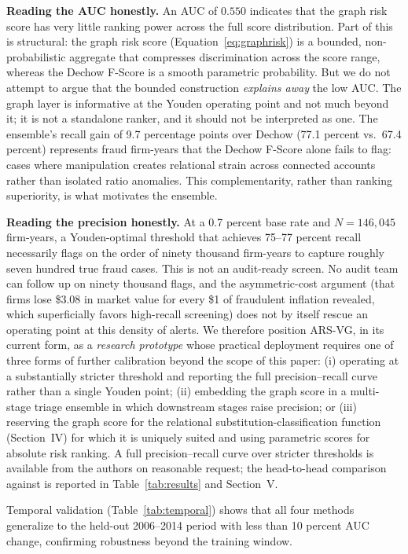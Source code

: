 \documentclass[12pt]{article}
\begin{document}
\textbf{Reading the AUC honestly.}  An AUC of $0.550$ indicates that the
graph risk score has very little ranking power across the full score
distribution.  Part of this is structural: the graph risk score
(Equation~\ref{eq:graphrisk}) is a bounded, non-probabilistic aggregate
that compresses discrimination across the score range, whereas the Dechow
F-Score is a smooth parametric probability.  But we do not attempt to
argue that the bounded construction \emph{explains away} the low AUC.
The graph layer is informative at the Youden operating point and not
much beyond it; it is not a standalone ranker, and it should not be
interpreted as one.  The ensemble's recall gain of 9.7 percentage points
over Dechow (77.1 percent vs.\ 67.4 percent) represents fraud firm-years that the
Dechow F-Score alone fails to flag: cases where manipulation creates
relational strain across connected accounts rather than isolated ratio
anomalies.  This complementarity, rather than ranking superiority,
is what motivates the ensemble.

\textbf{Reading the precision honestly.}  At a 0.7 percent base rate and
$N = 146{,}045$ firm-years, a Youden-optimal threshold that achieves
75--77 percent recall necessarily flags on the order of ninety thousand
firm-years to capture roughly seven hundred true fraud cases.  This is
not an audit-ready screen.  No audit team can follow up on ninety thousand
flags, and the \citet{karpoff2008} asymmetric-cost argument (that firms
lose \$3.08 in market value for every \$1 of fraudulent inflation revealed,
which superficially favors high-recall screening) does not by itself
rescue an operating point at this density of alerts.  We therefore
position ARS-VG, in its current form, as a \emph{research prototype} whose
practical deployment requires one of three forms of further calibration
beyond the scope of this paper: (i) operating at a substantially stricter
threshold and reporting the full precision--recall curve rather than a
single Youden point; (ii) embedding the graph score in a multi-stage
triage ensemble in which downstream stages raise precision; or
(iii) reserving the graph score for the relational substitution-classification
function (Section~IV) for which it is uniquely
suited and using parametric scores for absolute risk ranking.  A full
precision--recall curve over stricter thresholds is available from the
authors on reasonable request; the head-to-head comparison
against \citet{bao2020} is reported in Table~\ref{tab:results} and
Section~V.

Temporal validation (Table~\ref{tab:temporal}) shows that all four
methods generalize to the held-out 2006--2014 period with less than
10 percent AUC change, confirming robustness beyond the training window.
\end{document}
